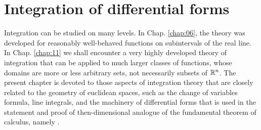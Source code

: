 \chapter{Integration of differential forms}
\label{chap:10}

Integration can be studied on many levels.
In Chap. \ref{chap:06}, the theory was developed for reasonably well-behaved functions on subintervals of the real line.
In Chap. \ref{chap:11} we shall encounter a very highly developed theory of integration that can be applied to much larger classes of functions,
whose domains are more or less arbitrary sets,
not necessarily subsets of ${\protect\mathbb R}^n$.
The present chapter is devoted to those aspects of integration theory that are closely related to the
geometry of euclidean spaces, such as the change of variables formula, line integrals, and the machinery of differential forms that is used in the statement and proof of then-dimensional analogue of the fundamental theorem of calculus, namely .











